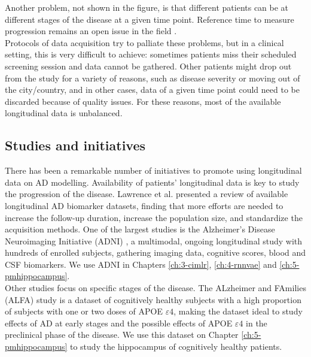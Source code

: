 Another problem, not shown in the figure, is that different patients can be at different stages of the disease at a given time point. Reference time to measure progression remains an open issue in the field \cite{Ashford2001}.  \\

Protocols of data acquisition try to palliate these problems, but in a clinical setting, this is very difficult to achieve: sometimes patients miss their scheduled screening session and data cannot be gathered. Other patients might drop out from the study for a variety of reasons, such as disease severity or moving out of the city/country, and in other cases, data of a given time point could need to be discarded because of quality issues. For these reasons, most of the available longitudinal data is unbalanced. \\

\subsection{Studies and initiatives} 

There has been a remarkable number of initiatives to promote using longitudinal data on AD modelling. Availability of patients' longitudinal data is key to study the progression of the disease. Lawrence et al. \cite{Lawrence2017} presented a review of available longitudinal AD biomarker datasets, finding that more efforts are needed to increase the follow-up duration, increase the population size, and standardize the acquisition methods. One of the largest studies is the Alzheimer's Disease Neuroimaging Initiative (ADNI) \cite{Mueller2005}, a multimodal, ongoing longitudinal study with hundreds of enrolled subjects, gathering imaging data, cognitive scores, blood and CSF biomarkers. We use ADNI in Chapters \ref{ch:3-cimlr}, \ref{ch:4-rnnvae} and \ref{ch:5-pmhippocampus}. \\

Other studies focus on specific stages of the disease. The ALzheimer and FAmilies (ALFA) study \cite{Molinuevo2016} is a dataset of cognitively healthy subjects with a high proportion of subjects with one or two doses of APOE $\varepsilon4$, making the dataset ideal to study effects of AD at early stages and the possible effects of APOE $\varepsilon4$ in the preclinical phase of the disease. We use this dataset on Chapter \ref{ch:5-pmhippocampus} to study the hippocampus of cognitively healthy patients. \\

